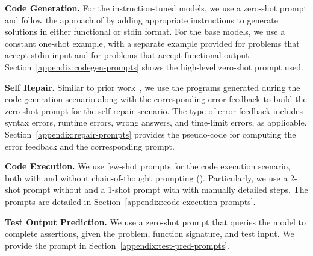 \vspace{2pt}
\noindent \textbf{Code Generation.} 
For the instruction-tuned models, we use a zero-shot prompt and follow the approach of \citet{hendrycks2021measuring} by adding appropriate instructions to generate solutions in either functional or stdin format.
For the base models, we use a constant one-shot example, with a separate example provided for problems that accept stdin input and for problems that accept functional output.
Section~\ref{appendix:codegen-prompts} shows the high-level zero-shot prompt used.

\vspace{2pt}
\noindent \textbf{Self Repair.} 
Similar to prior work~\cite{olausson2023demystifying}, we use the programs generated during the code generation scenario 
along with the corresponding error feedback to build the zero-shot prompt for the self-repair scenario.
The type of error feedback includes syntax errors, runtime errors, wrong answers, and time-limit errors, as applicable.
Section~\ref{appendix:repair-prompts} provides the pseudo-code for computing the error feedback and the corresponding prompt.

\vspace{2pt}
\noindent \textbf{Code Execution.} 
We use few-shot prompts for the code execution scenario, both with and without chain-of-thought prompting (\chainot{}). 
Particularly, we use a 2-shot prompt without \chainot{} and a 1-shot prompt with \chainot{} with manually detailed steps.
The prompts are detailed in Section~\ref{appendix:code-execution-prompts}.

\vspace{1pt}
\noindent \textbf{Test Output Prediction.} 
We use a zero-shot prompt that queries the model to complete assertions, given the problem, function signature, and test input. 
We provide the prompt in Section~\ref{appendix:test-pred-prompts}.
